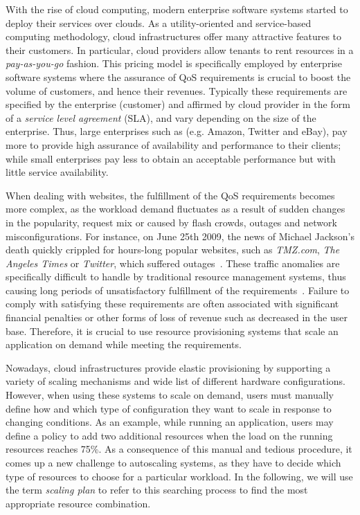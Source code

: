 With the rise of cloud computing, modern enterprise software systems started to deploy their services over clouds. As a utility-oriented and service-based computing methodology, cloud infrastructures offer many attractive features to their customers.  In particular, cloud providers allow tenants to rent resources in a \emph{pay-as-you-go} fashion. This pricing model is specifically employed by enterprise software systems where the assurance of QoS requirements is crucial to boost the volume of customers, and hence their revenues. Typically these requirements are specified by the enterprise (customer) and affirmed by cloud provider in the form of a \emph{service level agreement} (SLA), and vary depending on the size of the enterprise. Thus, large enterprises such as (e.g. Amazon, Twitter and eBay), pay more to provide high assurance of availability and performance to their clients; while small enterprises pay less to obtain an acceptable performance but with little service availability. 



When dealing with websites, the fulfillment of the QoS requirements becomes more complex, as the workload demand fluctuates as a result of sudden changes in the popularity, request mix or caused by flash crowds, outages and network misconfigurations.
For instance, on June 25th 2009, the news of Michael Jackson's death quickly crippled for hours-long popular websites, such as \emph{TMZ.com}, \emph{The Angeles Times} or \emph{Twitter}, which suffered outages~\cite{outagesTimes}. These traffic anomalies are specifically difficult to handle by traditional resource management systems, thus causing long periods of unsatisfactory fulfillment of the requirements~\cite{trafficCongestion}. Failure to comply with satisfying these requirements are often associated with significant financial penalties or other forms of loss of revenue such as decreased in the user base. 
Therefore, it is crucial to use resource provisioning systems that scale an application on demand while meeting the requirements.

Nowadays, cloud infrastructures provide elastic provisioning by supporting a variety of scaling mechanisms and wide list of different hardware configurations. However, when using these systems to scale on demand, users must manually define how and which type of configuration they want to scale in response to changing conditions. As an example, while running an application, users may define a policy to add two additional resources when the load on the running resources reaches 75\%.  As a consequence of this manual and tedious procedure, it comes up a new challenge to autoscaling systems, as they have to decide which type of resources to choose for a particular workload. In the following, we will use the term \emph{scaling plan} to refer to this searching process to find the most appropriate resource combination.

